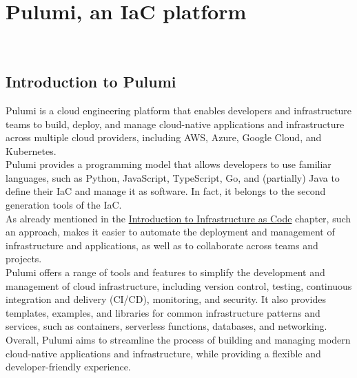 
\chapter{Pulumi, an IaC platform}
\label{cap:introduction-pulumi}

\\

\section{Introduction to Pulumi}
Pulumi is a cloud engineering platform that enables developers and infrastructure teams to build, deploy, and manage cloud-native applications and infrastructure across multiple cloud providers, including AWS, Azure, Google Cloud, and Kubernetes.\\
Pulumi provides a programming model that allows developers to use familiar languages, such as Python, JavaScript, TypeScript, Go, and (partially) Java to define their IaC and manage it as software.
In fact, it belongs to the second generation tools of the IaC.\\
As already mentioned in the \hyperref[cap:introduction-to-iac]{Introduction to Infrastructure as Code} chapter, such an approach, makes it easier to automate the deployment and management of infrastructure and applications, as well as to collaborate across teams and projects.\\
Pulumi offers a range of tools and features to simplify the development and management of cloud infrastructure, including version control, testing, continuous integration and delivery (CI/CD), monitoring, and security.
It also provides templates, examples, and libraries for common infrastructure patterns and services, such as containers, serverless functions, databases, and networking.\\
Overall, Pulumi aims to streamline the process of building and managing modern cloud-native applications and infrastructure, while providing a flexible and developer-friendly experience.

